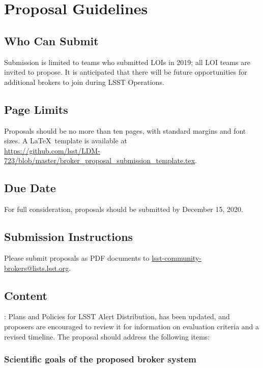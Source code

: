 \documentclass[DM,toc,lsstdraft]{lsstdoc}
\begin{document}
\section{Proposal Guidelines}

\subsection{Who Can Submit}

Submission is limited to teams who submitted LOIs in 2019; all LOI teams are invited to propose.
It is anticipated that there will be future opportunities for additional brokers to join during LSST Operations.

\subsection{Page Limits}

Proposals should be no more than ten pages, with standard margins and font sizes.
A \LaTeX\ template is available at \\
\url{https://github.com/lsst/LDM-723/blob/master/broker_proposal_submission_template.tex}.

\subsection{Due Date}

For full consideration, proposals should be submitted by December 15, 2020.

\subsection{Submission Instructions}

Please submit proposals as PDF documents to \url{lsst-community-brokers@lists.lsst.org}.

\subsection{Content}


: Plans and Policies for LSST Alert Distribution, has been updated, and proposers are encouraged to review it for information on evaluation criteria and a revised timeline.
The proposal should address the following items:

\subsubsection{Scientific goals of the proposed broker system}
\end{document}
